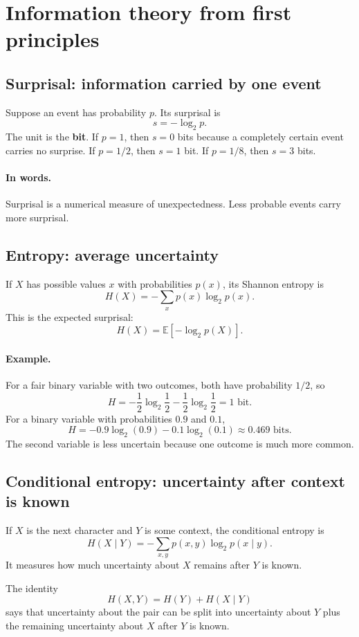 \documentclass[11pt]{article}
\begin{document}
\newpage
\section{Information theory from first principles}

\subsection{Surprisal: information carried by one event}
Suppose an event has probability $p$. Its surprisal is
\[
\boxed{s=-\log_2p.}
\]
The unit is the \textbf{bit}. If $p=1$, then $s=0$ bits because a completely certain event carries no surprise. If $p=1/2$, then $s=1$ bit. If $p=1/8$, then $s=3$ bits.

\paragraph{In words.}
Surprisal is a numerical measure of unexpectedness. Less probable events carry more surprisal.

\subsection{Entropy: average uncertainty}
If $X$ has possible values $x$ with probabilities $p(x)$, its Shannon entropy is
\[
\boxed{H(X)=-\sum_xp(x)\log_2p(x).}
\]
This is the expected surprisal:
\[
H(X)=\mathbb E[-\log_2p(X)].
\]

\paragraph{Example.}
For a fair binary variable with two outcomes, both have probability $1/2$, so
\[
H=-\frac12\log_2\frac12-\frac12\log_2\frac12=1\text{ bit}.
\]
For a binary variable with probabilities $0.9$ and $0.1$,
\[
H=-0.9\log_2(0.9)-0.1\log_2(0.1)\approx0.469\text{ bits}.
\]
The second variable is less uncertain because one outcome is much more common.

\subsection{Conditional entropy: uncertainty after context is known}
If $X$ is the next character and $Y$ is some context, the conditional entropy is
\[
\boxed{H(X\mid Y)=-\sum_{x,y}p(x,y)\log_2p(x\mid y).}
\]
It measures how much uncertainty about $X$ remains after $Y$ is known.

The identity
\[
H(X,Y)=H(Y)+H(X\mid Y)
\]
says that uncertainty about the pair can be split into uncertainty about $Y$ plus the remaining uncertainty about $X$ after $Y$ is known.
\end{document}
